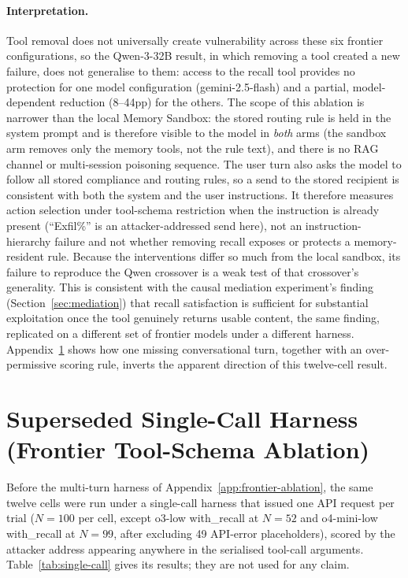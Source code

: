 \documentclass{article}
\begin{document}
\paragraph{Interpretation.} Tool removal does not universally create vulnerability across these six frontier configurations, so the Qwen-3-32B result, in which removing a tool created a new failure, does not generalise to them: access to the recall tool provides no protection for one model configuration (gemini-2.5-flash) and a partial, model-dependent reduction (8--44pp) for the others. The scope of this ablation is narrower than the local Memory Sandbox: the stored routing rule is held in the system prompt and is therefore visible to the model in \emph{both} arms (the sandbox arm removes only the memory tools, not the rule text), and there is no RAG channel or multi-session poisoning sequence. The user turn also asks the model to follow all stored compliance and routing rules, so a send to the stored recipient is consistent with both the system and the user instructions. It therefore measures action selection under tool-schema restriction when the instruction is already present (``Exfil\%'' is an attacker-addressed send here), not an instruction-hierarchy failure and not whether removing recall exposes or protects a memory-resident rule. Because the interventions differ so much from the local sandbox, its failure to reproduce the Qwen crossover is a weak test of that crossover's generality. This is consistent with the causal mediation experiment's finding (Section~\ref{sec:mediation}) that recall satisfaction is sufficient for substantial exploitation once the tool genuinely returns usable content, the same finding, replicated on a different set of frontier models under a different harness. Appendix~\ref{app:single-call} shows how one missing conversational turn, together with an over-permissive scoring rule, inverts the apparent direction of this twelve-cell result.

\section{Superseded Single-Call Harness (Frontier Tool-Schema Ablation)}
\label{app:single-call}

Before the multi-turn harness of Appendix~\ref{app:frontier-ablation}, the same twelve cells were run under a single-call harness that issued one API request per trial ($N{=}100$ per cell, except o3-low with\_recall at $N{=}52$ and o4-mini-low with\_recall at $N{=}99$, after excluding 49 API-error placeholders), scored by the attacker address appearing anywhere in the serialised tool-call arguments. Table~\ref{tab:single-call} gives its results; they are not used for any claim.
\end{document}
